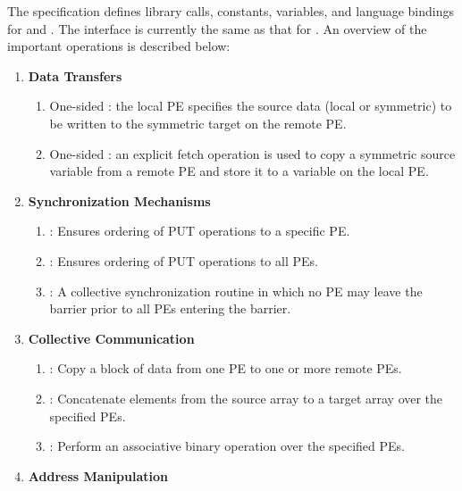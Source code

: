The \openshmem specification defines library calls, constants, variables, and language bindings for \Clang{} and \Fortran{}.
The \Cpp{} interface is currently the same as that for \Clang. An overview of the important \openshmem operations is described below:

\begin{enumerate}
\item \textbf{Data Transfers }

\begin{enumerate}
\item One-sided  : the local \ac{PE} specifies the source
data (local or symmetric) to be written to the symmetric target on the remote \ac{PE}. 
\item One-sided  : an explicit fetch operation is used to copy a symmetric source variable
from a remote \ac{PE} and store it to a variable on the local \ac{PE}.\end{enumerate}


\item \textbf{Synchronization Mechanisms }

\begin{enumerate}
\item {}: Ensures ordering of PUT operations to a specific \ac{PE}. 
\item {}: Ensures ordering of PUT operations to all \ac{PE}s. 
\item {}: A collective synchronization routine in which no \ac{PE} may leave
the barrier prior to all \ac{PE}s entering the barrier. 
\end{enumerate}
\item \textbf{Collective Communication}

\begin{enumerate}
\item {}: Copy a block of data from one \ac{PE} to one or more remote
PEs. 
\item {}: Concatenate elements from the source array to a target
array over the specified \ac{PE}s. 
\item {}: Perform an associative binary operation over the specified
\ac{PE}s. 
\end{enumerate}
\item \textbf{Address Manipulation}


\end{enumerate}
